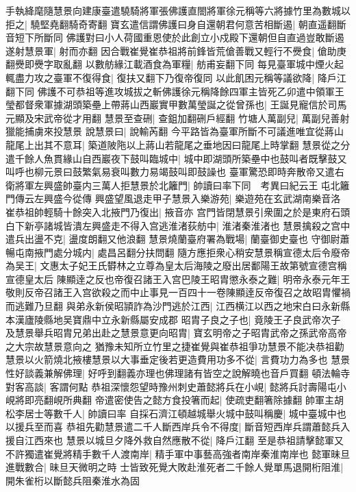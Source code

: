 手執絳麾隨慧景向建康臺遣驍騎將軍張佛護直閤將軍徐元稱等六將據竹里為數城以拒之|{
	驍堅堯翻騎奇寄翻}
寶玄遣信謂佛護曰身自還朝君何意苦相斷遏|{
	朝直遥翻斷音短下所斷同}
佛護對曰小人荷國重恩使於此創立小戍殿下還朝但自直過豈敢斷遏遂射慧景軍|{
	射而亦翻}
因合戰崔覺崔恭祖將前鋒皆荒傖善戰又輕行不㸑食|{
	傖助庚翻㸑即㸑字取亂翻}
以數舫緣江載酒食為軍糧|{
	舫甫妄翻下同}
每見臺軍城中煙火起輒盡力攻之臺軍不復得食|{
	復扶又翻下乃復帝復同}
以此飢困元稱等議欲降|{
	降戶江翻下同}
佛護不可恭祖等進攻城拔之斬佛護徐元稱降餘四軍主皆死乙卯遣中領軍王瑩都督衆軍據湖頭築壘上帶蔣山西巖實甲數萬瑩誕之從曾孫也|{
	王誕見寵信於司馬元顯及宋武帝從才用翻}
慧景至查硎|{
	查鉏加翻硎戶經翻}
竹塘人萬副兒|{
	萬副兒善射獵能捕虜來投慧景}
說慧景曰|{
	說輸芮翻}
今平路皆為臺軍所斷不可議進唯宜從蔣山龍尾上出其不意耳|{
	築道陂陁以上蔣山若龍尾之垂地因曰龍尾上時掌翻}
慧景從之分遣千餘人魚貫緣山自西巖夜下鼓叫臨城中|{
	城中即湖頭所築壘中也鼓叫者既擊鼓又叫呼也柳元景曰鼓繁氣易衰叫數力易竭鼓叫即鼓譟也}
臺軍驚恐即時奔散帝又遣右衛將軍左興盛帥臺内三萬人拒慧景於北籬門|{
	帥讀曰率下同　考異曰紀云王屯北籬門傳云左興盛今從傳}
興盛望風退走甲子慧景入樂游苑|{
	樂遊苑在玄武湖南樂音洛}
崔恭祖帥輕騎十餘突入北掖門乃復出|{
	掖音亦}
宫門皆閉慧景引衆圍之於是東府石頭白下新亭諸城皆潰左興盛走不得入宫逃淮渚荻舫中|{
	淮渚秦淮渚也}
慧景擒殺之宫中遣兵出盪不克|{
	盪度朗翻又他浪翻}
慧景燒蘭臺府署為戰場|{
	蘭臺御史臺也}
守御尉蕭暢屯南掖門處分城内|{
	處昌呂翻分扶問翻}
隨方應拒衆心稍安慧景稱宣德太后令廢帝為吴王|{
	文惠太子妃王氏欎林之立尊為皇太后海陵之廢出居鄱陽王故第號宣德宫稱宣德皇太后}
陳顯逹之反也帝復召諸王入宫巴陵王昭胄懲永泰之難|{
	明帝永泰元年王敬則反帝召諸王入宫欲殺之而中止事見一百四十一卷陳顯逹反帝復召之故昭胄懼禍而逃難乃旦翻}
與弟永新侯昭頴詐為沙門逃於江西|{
	江西横江以西之地宋白曰永新縣本漢廬陵縣地吴寶鼎中立永新縣屬安成郡}
昭胄子良之子也|{
	竟陵王子良武帝次子}
及慧景舉兵昭胄兄弟出赴之慧景意更向昭胄|{
	寶玄明帝之子昭胄武帝之孫武帝高帝之大宗故慧景意向之}
猶豫未知所立竹里之捷崔覺與崔恭祖爭功慧景不能决恭祖勸慧景以火箭燒北掖樓慧景以大事垂定後若更造費用功多不從|{
	言費功力為多也}
慧景性好談義兼解佛理|{
	好呼到翻義亦理也佛理諸有皆空之說解曉也音戶買翻}
頓法輪寺對客高談|{
	客謂何點}
恭祖深懷怨望時豫州刺史蕭懿將兵在小峴|{
	懿將兵討壽陽屯小峴將即亮翻峴所典翻}
帝遣密使告之懿方食投箸而起|{
	使疏吏翻箸除據翻}
帥軍主胡松李居士等數千人|{
	帥讀曰率}
自採石濟江頓越城舉火城中鼓叫稱慶|{
	城中臺城中也以援兵至而喜}
恭祖先勸慧景遣二千人斷西岸兵令不得度|{
	斷音短西岸兵謂蕭懿兵入援自江西來也}
慧景以城旦夕降外救自然應散不從|{
	降戶江翻}
至是恭祖請擊懿軍又不許獨遣崔覺將精手數千人渡南岸|{
	精手軍中事藝高強者南岸秦淮南岸也}
懿軍昧旦進戰數合|{
	昧旦天微明之時}
士皆致死覺大敗赴淮死者二千餘人覺單馬退開桁阻淮|{
	開朱雀桁以斷懿兵阻秦淮水為固}
